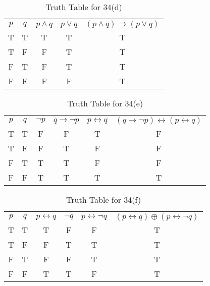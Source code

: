 \documentclass{Axon}
\begin{document}
\begin{table}[ht]
    \centering
    \begin{tabular}{c|c|c|c|c}
        \(p\) & \(q\) & \(p \land q\) & \(p \lor q\) & \((p \land q) \to (p \lor q)\) \\
        T     & T     & T             & T            & T                              \\
        T     & F     & F             & T            & T                              \\
        F     & T     & F             & T            & T                              \\
        F     & F     & F             & F            & T
    \end{tabular}
    \caption{Truth Table for 34(d)}
\end{table}

\begin{table}[ht]
    \centering
    \begin{tabular}{c|c|c|c|c|c}
        \(p\) & \(q\) & \(\lnot p\) & \(q \to \lnot p\) & \(p \leftrightarrow q\) & \((q \to \lnot p) \leftrightarrow (p \leftrightarrow q)\) \\
        T     & T     & F           & F                 & T                       & F                                                         \\
        T     & F     & F           & T                 & F                       & F                                                         \\
        F     & T     & T           & T                 & F                       & F                                                         \\
        F     & F     & T           & T                 & T                       & T
    \end{tabular}
    \caption{Truth Table for 34(e)}
\end{table}

\begin{table}[ht]
    \centering
    \begin{tabular}{c|c|c|c|c|c}
        \(p\) & \(q\) & \(p \leftrightarrow q\) & \(\lnot q\) & \(p \leftrightarrow \lnot q\) & \((p \leftrightarrow q) \oplus (p \leftrightarrow \lnot q)\) \\
        T     & T     & T                       & F           & F                             & T                                                            \\
        T     & F     & F                       & T           & T                             & T                                                            \\
        F     & T     & F                       & F           & T                             & T                                                            \\
        F     & F     & T                       & T           & F                             & T
    \end{tabular}
    \caption{Truth Table for 34(f)}
\end{table}
\end{document}
